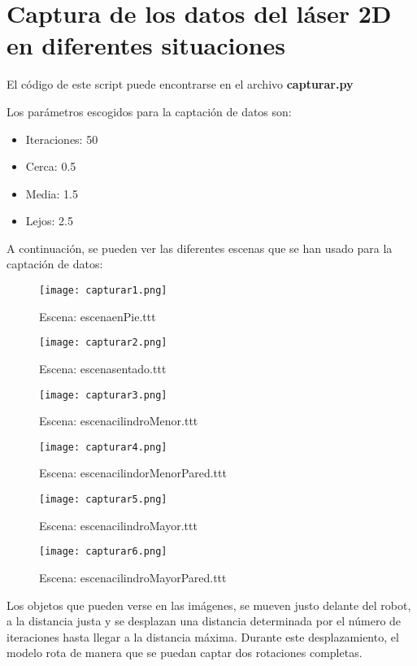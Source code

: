 \newpage

\section{Captura de los datos del láser 2D en diferentes situaciones}

El código de este script puede encontrarse en el archivo \textbf{capturar.py}

Los parámetros escogidos para la captación de datos son:
\begin{itemize}
	\item Iteraciones: 50
	\item Cerca: 0.5
	\item Media: 1.5
	\item Lejos: 2.5
\end{itemize}

A continuación, se pueden ver las diferentes escenas que se han usado para la captación de datos:

\begin{figure}[H]
	\centering
	\texttt{[image: capturar1.png]}
	\caption{Escena: escenaenPie.ttt}
\end{figure}
\begin{figure}[H]
	\centering
	\texttt{[image: capturar2.png]}
	\caption{Escena: escenasentado.ttt}
\end{figure}
\begin{figure}[H]
	\centering
	\texttt{[image: capturar3.png]}
	\caption{Escena: escenacilindroMenor.ttt}
\end{figure}
\begin{figure}[H]
	\centering
	\texttt{[image: capturar4.png]}
	\caption{Escena: escenacilindorMenorPared.ttt}
\end{figure}
\begin{figure}[H]
	\centering
	\texttt{[image: capturar5.png]}
	\caption{Escena: escenacilindroMayor.ttt}
\end{figure}
\begin{figure}[H]
	\centering
	\texttt{[image: capturar6.png]}
	\caption{Escena: escenacilindroMayorPared.ttt}
\end{figure}

\newpage

Los objetos que pueden verse en las imágenes, se mueven justo delante del robot, a la distancia justa y se desplazan una distancia determinada por el número de iteraciones hasta llegar a la distancia máxima. Durante este desplazamiento, el modelo rota de manera que se puedan captar dos rotaciones completas.

